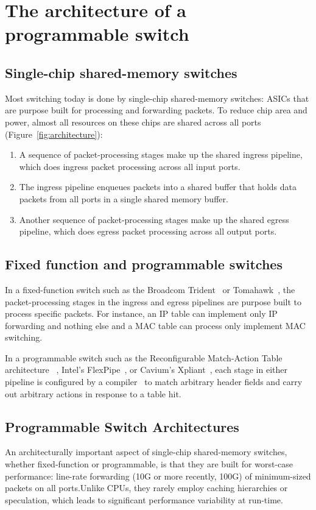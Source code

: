 \section{The architecture of a programmable switch}
\label{s:architecture}

\subsection{Single-chip shared-memory switches}

Most switching today is done by single-chip shared-memory switches: ASICs that
are purpose built for processing and forwarding packets. To reduce chip area
and power, almost all resources on these chips are shared across all ports
(Figure~\ref{fig:architecture}):
\begin{enumerate}
\item A sequence of packet-processing stages make up the shared ingress pipeline, which
 does ingress packet processing across all input ports.
\item The ingress pipeline enqueues packets into a shared buffer that holds data packets
from all ports in a single shared memory buffer.
\item Another sequence of packet-processing stages make up the shared egress pipeline, which
does egress packet processing across all output ports.
\end{enumerate}

\subsection{Fixed function and programmable switches}

In a fixed-function switch such as the Broadcom Trident~\cite{trident} or
Tomahawk~\cite{tomahawk}, the packet-processing stages in the ingress and
egress pipelines are purpose built to process specific packets. For
instance, an IP table can implement only IP forwarding and nothing else and a
MAC table can process only implement MAC switching.

In a programmable switch such as the Reconfigurable Match-Action Table
architecture ~\cite{rmt}, Intel's FlexPipe~\cite{flexpipe}, or Cavium's
Xpliant~\cite{xpliant}, each stage in either pipeline is configured by a
compiler~\cite{lavanya_nsdi} to match arbitrary header fields and carry out
arbitrary actions in response to a table hit.

\subsection{Programmable Switch Architectures}
An architecturally important aspect of single-chip shared-memory switches,
whether fixed-function or programmable, is that they are built for worst-case
performance: line-rate forwarding (10G or more recently, 100G) of minimum-sized
packets on all ports.Unlike CPUs, they rarely employ caching hierarchies or
speculation, which leads to significant performance variability at run-time.

